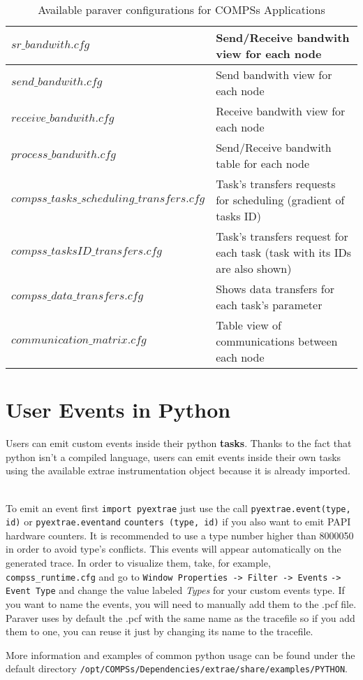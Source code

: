 \newpage

\bgroup
  \def\arraystretch{1.5}
  \begin{table}[!ht]
    \begin{center}
      \begin{tabular}{| p{} | p{} |}
	\hline
	$sr\_bandwith.cfg$ 			& Send/Receive bandwith view for each node \\ \hline
	$send\_bandwith.cfg$ 			& Send bandwith view for each node \\ \hline
	$receive\_bandwith.cfg$ 		& Receive bandwith view for each node \\ \hline
	$process\_bandwith.cfg$ 		& Send/Receive bandwith table for each node \\ \hline
	$compss\_tasks\_scheduling\_transfers.cfg$ 		& Task's transfers requests for scheduling (gradient of tasks ID) \\ \hline
	$compss\_tasksID\_transfers.cfg$ 	& Task's transfers request for each task (task with its IDs are also shown) \\ \hline
	$compss\_data\_transfers.cfg$ 		& Shows data transfers for each task's parameter \\ \hline
	$communication\_matrix.cfg$ 		& Table view of communications between each node \\ \hline
      \end{tabular}
      \caption{Available paraver configurations for COMPSs Applications}
      \label{tab:paraver_configs_comm}
    \end{center}
  \end{table}
\egroup


\section{User Events in Python}

Users can emit custom events inside their python \textbf{tasks}. Thanks to the fact that python isn't a compiled language, 
users can emit events inside their own tasks using the available extrae instrumentation object because it is already imported.
~ \newline

To emit an event first \verb|import pyextrae| just use the call \verb|pyextrae.event(type, id)| or \verb|pyextrae.eventand| \verb|counters (type, id)|
if you also want to emit PAPI hardware counters. It is recommended to use a type number higher than 8000050 in order 
to avoid type's conflicts. This events will appear automatically on the generated trace. In order to visualize them, take, 
for example, \verb|compss_runtime.cfg| and go to \verb|Window Properties -> Filter -> Events| \verb|-> Event Type| and change the 
value labeled \textit{Types} for your custom events type. If you want to name the events, you will need to manually add them to the .pcf file. Paraver uses by default the .pcf with the same name as the tracefile so if you add them to one, you can reuse it just by changing its name to the tracefile.
~ \newline

More information and examples of common python usage can be found under the default directory 
\verb|/opt/COMPSs/Dependencies/extrae/share/examples/PYTHON|.
